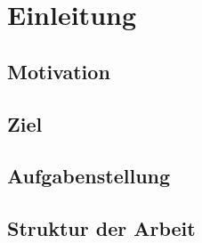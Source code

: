 \chapter{Einleitung}

\section{Motivation}
\section{Ziel}
\section{Aufgabenstellung}
\section{Struktur der Arbeit}
